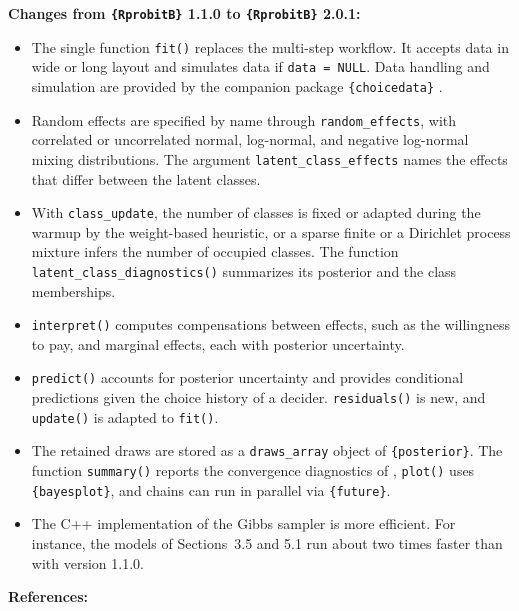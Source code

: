 \documentclass[12pt,a4paper]{article}
\newcommand{\proglang}[1]{\textsf{#1}}
\begin{document}
\newpage
\noindent \textbf{Changes from \texttt{\{RprobitB\}} 1.1.0 to
\texttt{\{RprobitB\}} 2.0.1:}

\begin{itemize}
\item The single function \texttt{fit()} replaces the multi-step workflow. It
accepts data in wide or long layout and simulates data if \texttt{data = NULL}.
Data handling and simulation are provided by the companion package
\texttt{\{choicedata\}} \parencite{Oelschlaeger2026a}.
\item Random effects are specified by name through \texttt{random\_effects},
with correlated or uncorrelated normal, log-normal, and negative log-normal
mixing distributions. The argument \texttt{latent\_class\_effects} names the
effects that differ between the latent classes.
\item With \texttt{class\_update}, the number of classes is fixed or adapted
during the warmup by the weight-based heuristic, or a sparse finite or a
Dirichlet process mixture infers the number of occupied classes. The function
\texttt{latent\_class\_diagnostics()} summarizes its posterior and the class
memberships.
\item \texttt{interpret()} computes compensations between effects, such as the
willingness to pay, and marginal effects, each with posterior uncertainty.
\item \texttt{predict()} accounts for posterior uncertainty and provides
conditional predictions given the choice history of a decider.
\texttt{residuals()} is new, and \texttt{update()} is adapted to \texttt{fit()}.
\item The retained draws are stored as a \texttt{draws\_array} object of
\texttt{\{posterior\}}. The function \texttt{summary()} reports the convergence
diagnostics of \textcite{Vehtari2021}, \texttt{plot()} uses
\texttt{\{bayesplot\}}, and chains can run in parallel via \texttt{\{future\}}.
\item The \proglang{C++} implementation of the Gibbs sampler is more efficient.
For instance, the models of Sections~3.5 and 5.1 run about two times faster than
with version 1.1.0.
\end{itemize}

\noindent \textbf{References:}

\printbibliography[heading=none]
\end{document}
